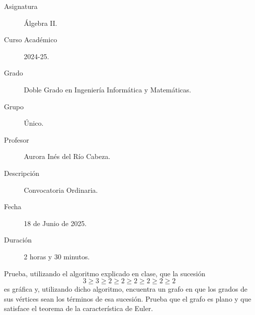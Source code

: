 \documentclass[12pt]{article}
\begin{document}

    
    

    \begin{description}
        \item[Asignatura] Álgebra II.
        \item[Curso Académico] 2024-25.
        \item[Grado] Doble Grado en Ingeniería Informática y Matemáticas.
        \item[Grupo] Único.
        \item[Profesor] Aurora Inés del Río Cabeza.
        \item[Descripción] Convocatoria Ordinaria.
        \item[Fecha] 18 de Junio de 2025.
        \item[Duración] 2 horas y 30 minutos.
    
    \end{description}
    \newpage


    
    \begin{ejercicio}[1 punto]
        Prueba, utilizando el algoritmo explicado en clase, que la sucesión
        $$3 \ge 3 \ge 2 \ge 2 \ge 2 \ge 2 \ge 2 \ge 2$$
        es gráfica y, utilizando dicho algoritmo, encuentra un grafo en que los grados de sus vértices sean los términos de esa sucesión. Prueba que el grafo es plano y que satisface el teorema de la característica de Euler.
    \end{ejercicio}
\end{document}
